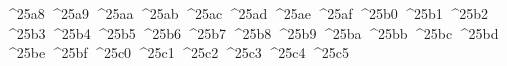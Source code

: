 {  ^^^^25a8%
  ^^^^25a9%
  ^^^^25aa%
  ^^^^25ab%
  ^^^^25ac%
  ^^^^25ad%
  ^^^^25ae%
  ^^^^25af%
  ^^^^25b0%
  ^^^^25b1%
  ^^^^25b2%
  ^^^^25b3%
  ^^^^25b4%
  ^^^^25b5%
  ^^^^25b6%
  ^^^^25b7%
  ^^^^25b8%
  ^^^^25b9%
  ^^^^25ba%
  ^^^^25bb%
  ^^^^25bc%
  ^^^^25bd%
  ^^^^25be%
  ^^^^25bf%
  ^^^^25c0%
  ^^^^25c1%
  ^^^^25c2%
  ^^^^25c3%
  ^^^^25c4%
  ^^^^25c5%
}
